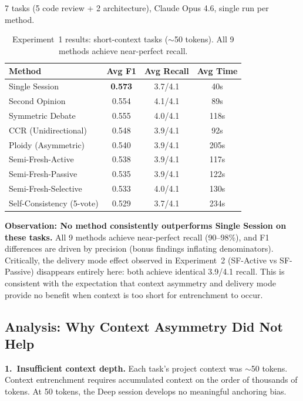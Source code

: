 \documentclass[11pt]{article}
\begin{document}
7 tasks (5 code review + 2 architecture), Claude Opus 4.6, single run per method.

\begin{table}[t]
\centering
\caption{Experiment~1 results: short-context tasks ($\sim$50 tokens). All 9 methods achieve near-perfect recall.}
\label{tab:exp1}
\small
\begin{tabular}{@{}lccc@{}}
\toprule
\textbf{Method} & \textbf{Avg F1} & \textbf{Avg Recall} & \textbf{Avg Time} \\
\midrule
Single Session            & \textbf{0.573} & 3.7/4.1 & 40s  \\
Second Opinion            & 0.554          & 4.1/4.1 & 89s  \\
Symmetric Debate          & 0.555          & 4.0/4.1 & 118s \\
CCR (Unidirectional)      & 0.548          & 3.9/4.1 & 92s  \\
Ploidy (Asymmetric)       & 0.540          & 3.9/4.1 & 205s \\
Semi-Fresh-Active         & 0.538          & 3.9/4.1 & 117s \\
Semi-Fresh-Passive        & 0.535          & 3.9/4.1 & 122s \\
Semi-Fresh-Selective      & 0.533          & 4.0/4.1 & 130s \\
Self-Consistency (5-vote) & 0.529          & 3.7/4.1 & 234s \\
\bottomrule
\end{tabular}
\end{table}

\textbf{Observation: No method consistently outperforms Single Session on these tasks.} All 9 methods achieve near-perfect recall (90--98\%), and F1 differences are driven by precision (bonus findings inflating denominators). Critically, the delivery mode effect observed in Experiment~2 (SF-Active vs SF-Passive) disappears entirely here: both achieve identical 3.9/4.1 recall. This is consistent with the expectation that context asymmetry and delivery mode provide no benefit when context is too short for entrenchment to occur.

\subsection{Analysis: Why Context Asymmetry Did Not Help}
\label{sec:why-no-help}

\textbf{1.\ Insufficient context depth.} Each task's project context was $\sim$50 tokens. Context entrenchment requires accumulated context on the order of thousands of tokens. At 50 tokens, the Deep session develops no meaningful anchoring bias.
\end{document}
